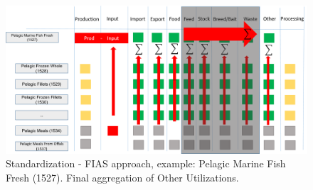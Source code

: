 \documentclass[nojss]{jss}
\begin{document}
\begin{center}
\begin{figure}
\includegraphics{flow-charts/standardization/FIAS_standardization2.png}
\caption{Standardization - FIAS approach, example: Pelagic Marine Fish Fresh  (1527). Final aggregation of Other Utilizations.}
\end{figure}
\end{center}
\end{document}
